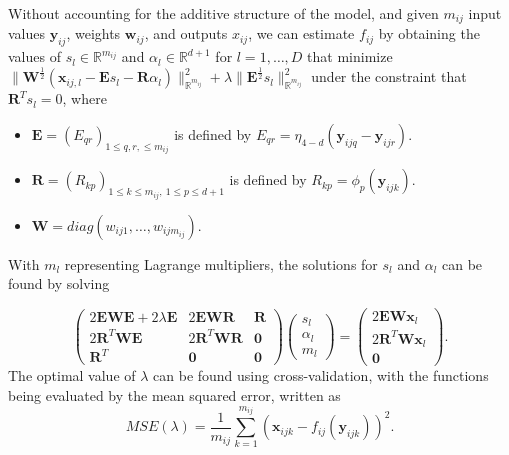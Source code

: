 \documentclass[11pt,reqno]{article}
\theoremstyle{definition}
\begin{document}
Without accounting for the additive structure of the model, and given $m_{ij}$ input values $\mathbf{y}_{ij}$, weights $\mathbf{w}_{ij}$, and outputs $x_{ij}$, we can estimate $f_{ij}$ by obtaining the values of $s_l \in \mathbb{R}^{m_{ij}}$ and $\alpha_l \in \mathbb{R}^{d + 1}$ for $l = 1, \dots, D$ that minimize $\|\mathbf{W}^{\frac{1}{2}}\left(\mathbf{x}_{ij, l} - \mathbf{E}s_l - \mathbf{R}\alpha_l\right)\|^2_{\mathbb{R}^{m_{ij}}} + \lambda\|\mathbf{E}^{\frac{1}{2}}s_l\|^2_{\mathbb{R}^{m_{ij}}}$ under the constraint that $\mathbf{R}^{T}s_l = 0$, where
\begin{itemize}
  \item $\mathbf{E} = (E_{qr})_{1 \leq q, r, \leq m_{ij}}$ is defined by $E_{qr} = \eta_{4-d}(\mathbf{y}_{ijq} - \mathbf{y}_{ijr})$.
  \item $\mathbf{R} = \left(R_{kp}\right)_{1 \leq k \leq m_{ij}, \ 1 \leq p \leq d + 1}$ is defined by $R_{kp} = \phi_p(\mathbf{y}_{ijk})$.
  \item $\mathbf{W} = diag(w_{ij1}, \dots, w_{ijm_{ij}})$.
\end{itemize}

With $m_l$ representing Lagrange multipliers, the solutions for $s_l$ and $\alpha_l$ can be found by solving

\begin{equation}
   \left(\begin{array}{ccc}
    2\mathbf{EWE} + 2\lambda\mathbf{E} & 2\mathbf{EWR} & \mathbf{R} \\
    2\mathbf{R}^{T}\mathbf{WE} & 2\mathbf{R}^{T}\mathbf{WR} & \mathbf{0} \\
    \mathbf{R}^{T} & \mathbf{0} & \mathbf{0}
  \end{array}\right)\left(
  \begin{array}{c}
    s_l \\
    \alpha_l \\
    m_l
  \end{array}
  \right) = \left(
  \begin{array}{c}
    2\mathbf{EW}\mathbf{x}_l \\
    2\mathbf{R}^{T}\mathbf{W}\mathbf{x}_l \\
    \mathbf{0}
  \end{array}
  \right). \label{eq:5}
\end{equation}
The optimal value of $\lambda$ can be found using cross-validation, with the functions being evaluated by the mean squared error, written as
\begin{equation}
  MSE(\lambda) = \frac{1}{m_{ij}}\sum_{k=1}^{m_{ij}}\left(\mathbf{x}_{ijk} - f_{ij}(\mathbf{y}_{ijk})\right)^2. \label{eq:6}
\end{equation}
\end{document}
